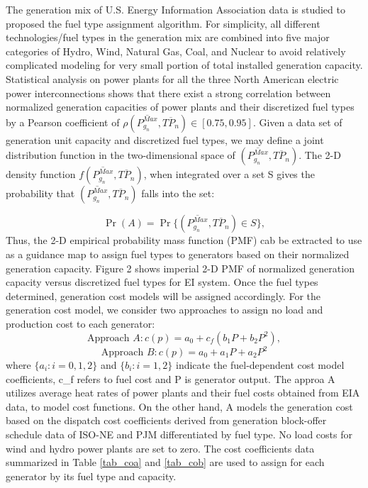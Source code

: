 \documentclass[12pt]{article}
\numberwithin{equation}{section}
\numberwithin{table}{section}
\numberwithin{figure}{section}
\begin{document}
The generation mix of U.S. Energy Information Association data  is studied to proposed the fuel type assignment algorithm. For simplicity, all different technologies/fuel types in the generation mix are combined into five major categories of Hydro, Wind, Natural Gas, Coal, and Nuclear to avoid relatively complicated modeling for very small portion of total installed generation capacity. Statistical analysis on power plants for all the three North American electric power interconnections shows that there exist a strong correlation between normalized generation capacities of power plants and their discretized fuel types by a Pearson coefficient of $\rho(\overline{P^{Max}_{g_n}}, \overline{TP_n}) \in [0.75, 0.95]$. Given a data set of generation unit capacity and discretized fuel types, we may define a joint distribution function in the two-dimensional space of $(\overline{P^{Max}_{g_n}}, \overline{TP_n})$. The 2-D density function $f(\overline{P^{Max}_{g_n}}, \overline{TP_n})$, when integrated over a set S gives the probability that $(\overline{P^{Max}_{g_n}}, \overline{TP_n})$ falls into the set:

\begin{equation}
	\Pr(A) = \Pr\{ (\overline{P^{Max}_{g_n}} , \overline{TP_n}) \in S \},
\end{equation}
Thus, the 2-D empirical probability mass function (PMF) cab be extracted to use as a guidance map to assign fuel types to generators based on their normalized generation capacity. Figure 2 shows imperial 2-D PMF of normalized generation capacity versus discretized fuel types for EI system. Once the fuel types determined, generation cost models will be assigned accordingly. For the generation cost model, we consider two approaches to assign no load and production cost to each generator:
\begin{equation}
	\textrm{Approach }A : c(p) = a_0 + c_f(b_1P+b_2P^2),
\end{equation}
\begin{equation}
	\textrm{Approach }B : c(p) = a_0 + a_1P+a_2P^2
\end{equation}
where $\{a_i \colon i=0,1,2\}$ and $\{b_i \colon i=1,2\}$ indicate the fuel-dependent cost model coefficients, c\_f refers to fuel cost and P is generator output.
The approa A utilizes average heat rates of power plants and their fuel costs obtained from EIA data, to model cost functions. On the other hand, A models the generation cost based on the dispatch cost coefficients derived from generation block-offer schedule data of ISO-NE  and PJM differentiated by fuel type. No load costs for wind and hydro power plants are set to zero. The cost coefficients data summarized in Table \ref{tab_coa} and \ref{tab_cob} are used to assign for each generator by its fuel type and capacity.
\end{document}
